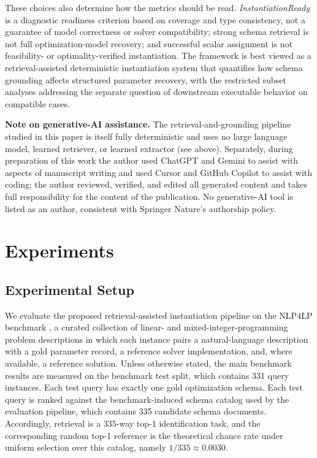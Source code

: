 \documentclass[pdflatex,sn-basic,Numbered]{sn-jnl}
\begin{document}
These choices also determine how the metrics should be read. \textit{InstantiationReady} is a diagnostic readiness criterion based on coverage and type consistency, not a guarantee of model correctness or solver compatibility; strong schema retrieval is not full optimization-model recovery; and successful scalar assignment is not feasibility- or optimality-verified instantiation. The framework is best viewed as a retrieval-assisted deterministic instantiation system that quantifies how schema grounding affects structured parameter recovery, with the restricted subset analyses addressing the separate question of downstream executable behavior on compatible cases.

\noindent\textbf{Note on generative-AI assistance.} The retrieval-and-grounding pipeline studied in this paper is itself fully deterministic and uses no large language model, learned retriever, or learned extractor (see above). Separately, during preparation of this work the author used ChatGPT and Gemini to assist with aspects of manuscript writing and used Cursor and GitHub Copilot to assist with coding; the author reviewed, verified, and edited all generated content and takes full responsibility for the content of the publication. No generative-AI tool is listed as an author, consistent with Springer Nature's authorship policy.

\section{Experiments}
\label{sec:experiments}

\subsection{Experimental Setup}
\label{subsec:exp_setup}

We evaluate the proposed retrieval-assisted instantiation pipeline on the \textsc{NLP4LP} benchmark \cite{nlp4lp_dataset,ahmaditeshnizi2024optimus_icml}, a curated collection of linear- and mixed-integer-programming problem descriptions in which each instance pairs a natural-language description with a gold parameter record, a reference solver implementation, and, where available, a reference solution. Unless otherwise stated, the main benchmark results are measured on the benchmark test split, which contains 331 query instances. Each test query has exactly one gold optimization schema. Each test query is ranked against the benchmark-induced schema catalog used by the evaluation pipeline, which contains 335 candidate schema documents. Accordingly, retrieval is a 335-way top-1 identification task, and the corresponding random top-1 reference is the theoretical chance rate under uniform selection over this catalog, namely $1/335 \approx 0.0030$.
\end{document}
